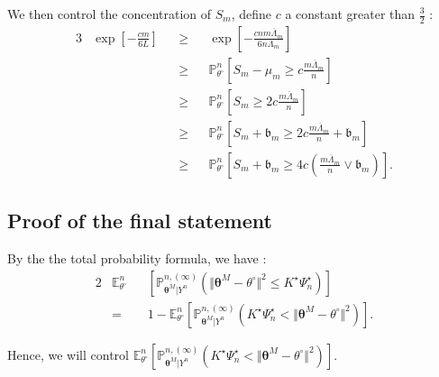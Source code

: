 We then control the concentration of $S_{m}$, define $c$ a constant greater than $\frac{3}{2}$ :
\begin{alignat*}{3}
& \exp\left[- \frac{c m}{6 L}\right] && \geq && \exp\left[- \frac{c n m \overline{\Lambda}_{m}}{6 n \Lambda_{m}}\right]\\
& && \geq && \mathds{P}_{\theta^{\circ}}^{n}\left[S_{m} - \mu_{m} \geq c \frac{m \overline{\Lambda}_{m}}{n}\right]\\
& && \geq && \mathds{P}_{\theta^{\circ}}^{n}\left[S_{m} \geq 2 c \frac{m \overline{\Lambda}_{m}}{n}\right]\\
& && \geq && \mathds{P}_{\theta^{\circ}}^{n}\left[S_{m} + \mathfrak{b}_{m} \geq 2 c \frac{m \overline{\Lambda}_{m}}{n} + \mathfrak{b}_{m} \right]\\
& && \geq && \mathds{P}_{\theta^{\circ}}^{n}\left[S_{m} + \mathfrak{b}_{m} \geq 4 c \left(\frac{m \overline{\Lambda}_{m}}{n} \vee \mathfrak{b}_{m}\right) \right].
\end{alignat*}



\subsection{Proof of the final statement}
By the the total probability formula, we have :
\begin{alignat*}{2}
& \mathds{E}_{\theta^{\circ}}^{n}&&\left[\mathds{P}_{\boldsymbol{\theta}^{M}\vert Y^{n}}^{n, (\infty)}\left(\Vert \boldsymbol{\theta}^{M} - \theta^{\circ} \Vert ^{2} \leq K^{\star} \Psi_{n}^{\star}\right)\right]\\
& = && 1 - \mathds{E}_{\theta^{\circ}}^{n}\left[\mathds{P}_{\boldsymbol{\theta}^{M}\vert Y^{n}}^{n, (\infty)}\left(K^{\star} \Psi_{n}^{\star} < \Vert \boldsymbol{\theta}^{M} - \theta^{\circ} \Vert^{2}\right)\right].
\end{alignat*}

Hence, we will control $\mathds{E}_{\theta^{\circ}}^{n}\left[\mathds{P}_{\boldsymbol{\theta}^{M}\vert Y^{n}}^{n, (\infty)}\left(K^{\star} \Psi_{n}^{\star} < \Vert \boldsymbol{\theta}^{M} - \theta^{\circ} \Vert ^{2}\right)\right]$.

